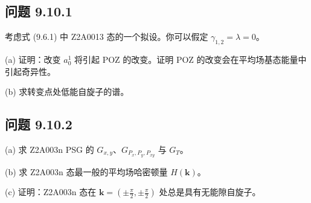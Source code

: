 \subsection*{问题 9.10.1}

考虑式 (9.6.1) 中 Z2A0013 态的一个拟设。你可以假定 $\gamma_{1,2}=\lambda=0$。

(a) 证明：改变 $a_{0}^{1}$ 将引起 POZ 的改变。证明 POZ 的改变会在平均场基态能量中引起奇异性。

(b) 求转变点处低能自旋子的谱。

\subsection*{问题 9.10.2}

(a) 求 Z2A003n PSG 的 $G_{x,y}$、$G_{P_{x},P_{y},P_{xy}}$ 与 $G_{T}$。

(b) 求 Z2A003n 态最一般的平均场哈密顿量 $H(\pmb{k})$。

(c) 证明：Z2A003n 态在 $\pmb{k}=(\pm\frac{\pi}{2},\pm\frac{\pi}{2})$ 处总是具有无能隙自旋子。


